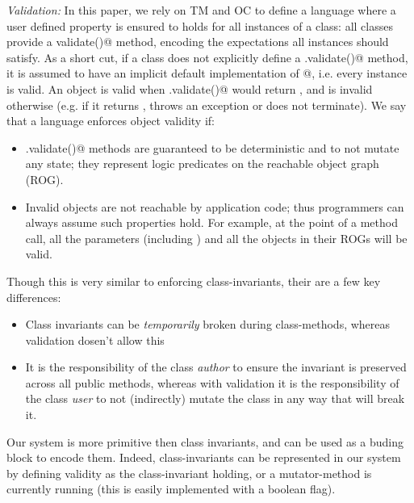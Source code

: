 \loseSpace
\noindent\textit{Validation:}
\label{s:validation}
In this paper, we rely on TM and OC to define a language where a user defined property is ensured to holds for all instances of a class:
all classes provide a \Q@Bool validate()@ method, encoding the expectations all instances should satisfy.
As a short cut, if a class does not explicitly define a
\Q@.validate()@ method, it is assumed to have an implicit default implementation of @, i.e. every instance is valid.
An object \Q@o@ is valid when \Q@o.validate()@ would return \Q@true@, and is invalid otherwise (e.g. if it returns \Q@false@, throws an exception or does not terminate).
We say that a language enforces object validity if:
\begin{itemize}
\item \Q@.validate()@ methods are guaranteed to be deterministic and to not mutate any state; they represent logic predicates on the reachable object graph (ROG).
\item Invalid objects are not reachable by application code; thus programmers can always assume such properties hold.
For example, at the point of a method call, all the parameters (including \Q@this@) and all the objects in their ROGs will be valid.
\end{itemize}

\noindent Though this is very similar to enforcing class-invariants, their are a few key differences:
\begin{itemize}
\item Class invariants can be \emph{temporarily} broken during class-methods, whereas validation dosen’t allow this
\item It is the responsibility of the class \emph{author} to ensure the invariant is preserved across all public methods, whereas with validation it is the responsibility of the class \emph{user} to not (indirectly) mutate the class in any way that will break it.
\end{itemize}
\noindent Our system is more primitive then class invariants, and can be used as a buding block to encode 
them.
Indeed, class-invariants can be represented in our system by defining validity as 
the class-invariant holding, or a mutator-method is currently running (this is easily implemented with a boolean flag).

